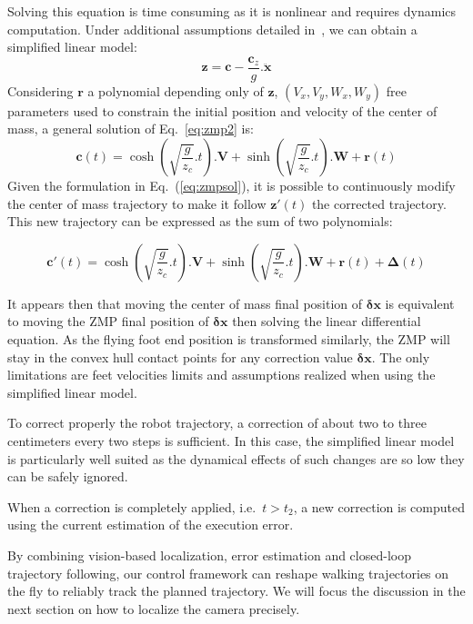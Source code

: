 Solving this equation is time consuming as it is nonlinear and
requires dynamics computation. Under additional assumptions detailed
in~\cite{Kajita01iros}, we can obtain a simplified linear model:
%
\begin{equation} \label{eq:zmp2}
  \mathbf{z} = \mathbf{c} - \frac{\mathbf{c}_z}{g} . \ddot{\mathbf{x}}
\end{equation}
%
Considering $\mathbf{r}$ a polynomial depending only of $\mathbf{z}$,
$(V_x, V_y, W_x, W_y)$ free parameters used to constrain the initial
position and velocity of the center of mass, a general solution of
Eq.~\ref{eq:zmp2} is:
%
\begin{equation} \label{eq:zmpsol}
  \mathbf{c}(t) = \cosh(\sqrt{\frac{g}{z_c}}.t) . \mathbf{V} + \sinh(\sqrt{\frac{g}{z_c}}.t) . \mathbf{W} + \mathbf{r}(t)
\end{equation}
%
Given the formulation in Eq.~(\ref{eq:zmpsol}), it is possible to
continuously modify the center of mass trajectory to make it follow
\mbox{$\mathbf{z}'(t)$} the corrected trajectory. This new
trajectory can be expressed as the sum of two polynomials:

\begin{equation} \label{eq:zmpsolcor}
  \mathbf{c}'(t) = \cosh(\sqrt{\frac{g}{z_c}}.t) . \mathbf{V} +
  \sinh(\sqrt{\frac{g}{z_c}}.t) . \mathbf{W} + \mathbf{r}(t) + \mathbf{\Delta}(t)
\end{equation}

It appears then that moving the center of mass final position of
$\mathbf{\delta x}$ is equivalent to moving the ZMP final position of
$\mathbf{\delta x}$ then solving the linear differential equation. As
the flying foot end position is transformed similarly, the ZMP will
stay in the convex hull contact points for any correction value
$\mathbf{\delta x}$. The only limitations are feet velocities limits
and assumptions realized when using the simplified linear model.

To correct properly the robot trajectory, a correction of about two to
three centimeters every two steps is sufficient. In this case, the
simplified linear model is particularly well suited as the dynamical
effects of such changes are so low they can be safely ignored.

When a correction is completely applied, i.e.\ $t > t_2$, a new
correction is computed using the current estimation of the execution
error.

By combining vision-based localization, error estimation and
closed-loop trajectory following, our control framework can reshape
walking trajectories on the fly to reliably track the planned
trajectory. We will focus the discussion in the next section on how to
localize the camera precisely.

